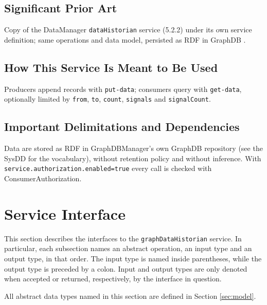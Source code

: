 \documentclass[a4paper]{arrowhead}
\begin{document}
\subsection{Significant Prior Art}

Copy of the DataManager \texttt{dataHistorian} service (5.2.2) under its own service definition; same operations and data model, persisted as RDF in GraphDB \cite{graphdb}.

\subsection{How This Service Is Meant to Be Used}

Producers append records with \texttt{put-\allowbreak{}data}; consumers query with \texttt{get-\allowbreak{}data}, optionally limited by \texttt{from}, \texttt{to}, \texttt{count}, \texttt{signals} and \texttt{signalCount}.

\subsection{Important Delimitations and Dependencies}
\label{sec:delimitations}

Data are stored as RDF in GraphDBManager's own GraphDB repository (see the SysDD for the vocabulary), without retention policy and without inference. With \texttt{service.\allowbreak{}authorization.\allowbreak{}enabled=\allowbreak{}true} every call is checked with Consumer\allowbreak{}Authorization.

\newpage

\section{Service Interface}
\label{sec:operations}

This section describes the interfaces to the \texttt{graphDataHistorian} service.
In particular, each subsection names an abstract operation, an input type and an output type, in that order.
The input type is named inside parentheses, while the output type is preceded by a colon.
Input and output types are only denoted when accepted or returned, respectively, by the interface in question.

All abstract data types named in this section are defined in Section \ref{sec:model}.
\end{document}
